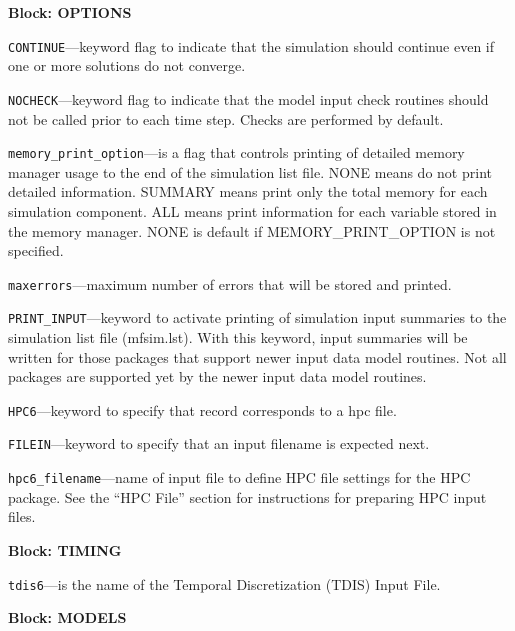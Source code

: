
\item \textbf{Block: OPTIONS}

\begin{description}
\item \texttt{CONTINUE}---keyword flag to indicate that the simulation should continue even if one or more solutions do not converge.

\item \texttt{NOCHECK}---keyword flag to indicate that the model input check routines should not be called prior to each time step. Checks are performed by default.

\item \texttt{memory\_print\_option}---is a flag that controls printing of detailed memory manager usage to the end of the simulation list file.  NONE means do not print detailed information. SUMMARY means print only the total memory for each simulation component. ALL means print information for each variable stored in the memory manager. NONE is default if MEMORY\_PRINT\_OPTION is not specified.

\item \texttt{maxerrors}---maximum number of errors that will be stored and printed.

\item \texttt{PRINT\_INPUT}---keyword to activate printing of simulation input summaries to the simulation list file (mfsim.lst). With this keyword, input summaries will be written for those packages that support newer input data model routines.  Not all packages are supported yet by the newer input data model routines.

\item \texttt{HPC6}---keyword to specify that record corresponds to a hpc file.

\item \texttt{FILEIN}---keyword to specify that an input filename is expected next.

\item \texttt{hpc6\_filename}---name of input file to define HPC file settings for the HPC package. See the ``HPC File'' section for instructions for preparing HPC input files.

\end{description}
\item \textbf{Block: TIMING}

\begin{description}
\item \texttt{tdis6}---is the name of the Temporal Discretization (TDIS) Input File.

\end{description}
\item \textbf{Block: MODELS}

